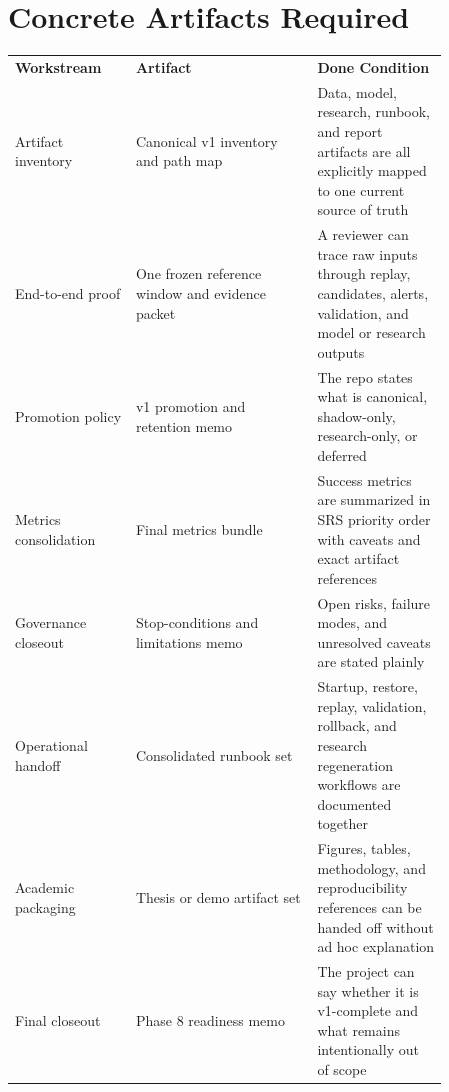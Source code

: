 \documentclass{article}
\begin{document}
\section*{Concrete Artifacts Required}
\begin{longtable}{p{0.24\linewidth}p{0.36\linewidth}p{0.26\linewidth}}
\textbf{Workstream} & \textbf{Artifact} & \textbf{Done Condition} \\
Artifact inventory & Canonical v1 inventory and path map & Data, model, research, runbook, and report artifacts are all explicitly mapped to one current source of truth \\
End-to-end proof & One frozen reference window and evidence packet & A reviewer can trace raw inputs through replay, candidates, alerts, validation, and model or research outputs \\
Promotion policy & v1 promotion and retention memo & The repo states what is canonical, shadow-only, research-only, or deferred \\
Metrics consolidation & Final metrics bundle & Success metrics are summarized in SRS priority order with caveats and exact artifact references \\
Governance closeout & Stop-conditions and limitations memo & Open risks, failure modes, and unresolved caveats are stated plainly \\
Operational handoff & Consolidated runbook set & Startup, restore, replay, validation, rollback, and research regeneration workflows are documented together \\
Academic packaging & Thesis or demo artifact set & Figures, tables, methodology, and reproducibility references can be handed off without ad hoc explanation \\
Final closeout & Phase 8 readiness memo & The project can say whether it is v1-complete and what remains intentionally out of scope \\
\end{longtable}
\end{document}
